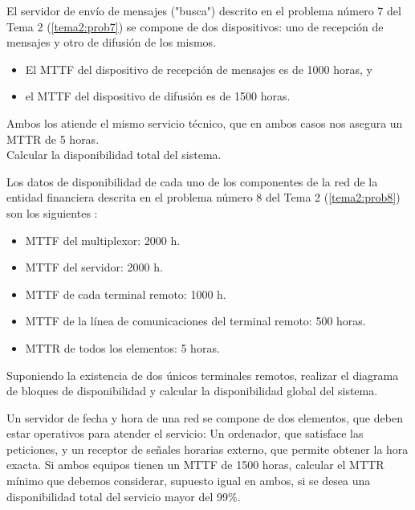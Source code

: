 \begin{problem}[3]
El servidor de envío de mensajes ("busca") descrito en el problema número 7 del Tema 2 (\ref{tema2:prob7}) se compone de dos dispositivos: uno de recepción de mensajes y otro de difusión de los mismos.
\begin{itemize}
\item El MTTF del dispositivo de recepción de mensajes es de 1000 horas, y
\item el MTTF del dispositivo de difusión es de 1500 horas.
\end{itemize}
Ambos los atiende el mismo servicio técnico, que en ambos casos nos asegura un MTTR de 5 horas.\\

Calcular la disponibilidad total del sistema.

\solution



\end{problem}

\begin{problem}[4]
Los datos de disponibilidad de cada uno de los componentes de la red de la entidad financiera descrita en el problema número 8 del Tema 2 (\ref{tema2:prob8}) son los siguientes :
\begin{itemize}
	\item MTTF del multiplexor: 2000 h.
	\item MTTF del servidor: 2000 h.
	\item MTTF de cada terminal remoto: 1000 h.
	\item MTTF de la línea de comunicaciones del terminal remoto: 500 horas.
	\item MTTR de todos los elementos: 5 horas.
\end{itemize}

Suponiendo la existencia de dos únicos terminales remotos, realizar el diagrama de bloques de disponibilidad y calcular la disponibilidad global del sistema.

\solution



\end{problem}

\begin{problem}[5]
Un servidor de fecha y hora de una red se compone de dos elementos, que deben estar operativos para
atender el servicio: Un ordenador, que satisface las peticiones, y un receptor
de señales horarias externo, que permite obtener la hora exacta. Si ambos equipos
tienen un MTTF de 1500 horas, calcular el MTTR mínimo que debemos considerar,
supuesto igual en ambos, si se desea una disponibilidad total del servicio mayor del 99\%.

\solution



\end{problem}


